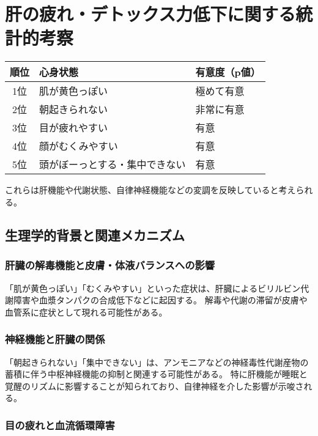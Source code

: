 \documentclass[a4paper,12pt]{article}
\begin{document}
\section{肝の疲れ・デトックス力低下に関する統計的考察}

\begin{table}[H]
\centering
\begin{tabular}{|c|l|l|}
\hline
順位 & 心身状態 & 有意度（p値） \\
\hline
1位 & 肌が黄色っぽい & 極めて有意 \\
2位 & 朝起きられない & 非常に有意 \\
3位 & 目が疲れやすい & 有意 \\
4位 & 顔がむくみやすい & 有意 \\
5位 & 頭がぼーっとする・集中できない & 有意 \\
\hline
\end{tabular}
\end{table}

これらは肝機能や代謝状態、自律神経機能などの変調を反映していると考えられる。

\subsection*{生理学的背景と関連メカニズム}

\subsubsection*{肝臓の解毒機能と皮膚・体液バランスへの影響}

「肌が黄色っぽい」「むくみやすい」といった症状は、肝臓によるビリルビン代謝障害や血漿タンパクの合成低下などに起因する。  
解毒や代謝の滞留が皮膚や血管系に症状として現れる可能性がある。

\subsubsection*{神経機能と肝臓の関係}

「朝起きられない」「集中できない」は、アンモニアなどの神経毒性代謝産物の蓄積に伴う中枢神経機能の抑制と関連する可能性がある。  
特に肝機能が睡眠と覚醒のリズムに影響することが知られており、自律神経を介した影響が示唆される。

\subsubsection*{目の疲れと血流循環障害}
\end{document}
